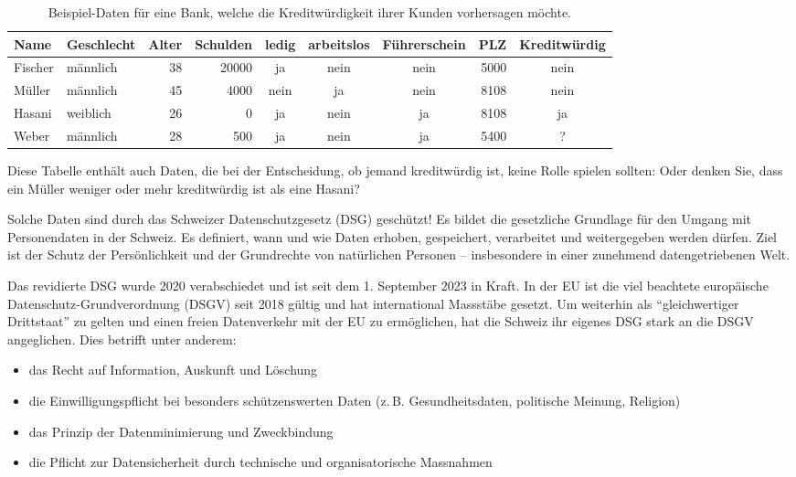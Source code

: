 \begin{lpu}
\begin{table}[h]
\begin{tabularx}{0.6\textwidth}{|l|l|r|r|c|c|c|r|c|}
\hline
\textbf{Name} & \textbf{Geschlecht} & \textbf{Alter} & \textbf{Schulden} & \textbf{ledig} & \textbf{arbeitslos} & \textbf{Führerschein} & \textbf{PLZ} & \textbf{Kreditwürdig} \\
\hline
Fischer & männlich & 38 & 20000 & ja & nein & nein & 5000 & nein \\
Müller  & männlich & 45 & 4000  & nein & ja & nein & 8108 & nein \\
Hasani  & weiblich & 26 & 0     & ja & nein & ja & 8108 & ja \\
Weber   & männlich & 28 & 500   & ja & nein & ja & 5400 & \cellcolor{orange}? \\
\hline
\end{tabularx}
\caption{Beispiel-Daten für eine Bank, welche die Kreditwürdigkeit ihrer Kunden vorhersagen möchte.}
\end{table}

Diese Tabelle enthält auch Daten, die bei der Entscheidung, ob jemand kreditwürdig ist, keine Rolle spielen sollten: Oder denken Sie, dass ein Müller weniger oder mehr kreditwürdig ist als eine Hasani?

\begin{theorie}
Solche Daten sind durch das Schweizer Datenschutzgesetz (DSG) geschützt! Es bildet die gesetzliche Grundlage für den Umgang mit Personendaten in der Schweiz. Es definiert, wann und wie Daten erhoben, gespeichert, verarbeitet und weitergegeben werden dürfen. Ziel ist der Schutz der Persönlichkeit und der Grundrechte von natürlichen Personen – insbesondere in einer zunehmend datengetriebenen Welt.

Das revidierte DSG wurde 2020 verabschiedet und ist seit dem 1. September 2023 in Kraft. In der EU ist die viel beachtete europäische Datenschutz-Grundverordnung (DSGV) seit 2018 gültig und hat international Massstäbe gesetzt. Um weiterhin als ``gleichwertiger Drittstaat'' zu gelten und einen freien Datenverkehr mit der EU zu ermöglichen, hat die Schweiz ihr eigenes DSG stark an die DSGV angeglichen. Dies betrifft unter anderem:

\begin{itemize}
  \item das Recht auf Information, Auskunft und Löschung
  \item die Einwilligungspflicht bei besonders schützenswerten Daten (z. B. Gesundheitsdaten, politische Meinung, Religion)
  \item das Prinzip der Datenminimierung und Zweckbindung
  \item die Pflicht zur Datensicherheit durch technische und organisatorische Massnahmen
\end{itemize}
\end{theorie}


\end{lpu}
